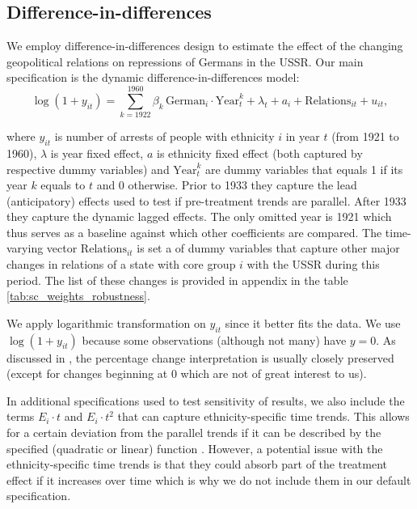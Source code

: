 \subsection{Difference-in-differences} \label{subsec:methodology_did}
We employ difference-in-differences design to estimate the effect of the changing geopolitical relations on repressions of Germans in the USSR. 
Our main specification is the dynamic difference-in-differences model:
\begin{equation}
 \log\left(1 + y_{it}\right) = \sum_{k= 1922}^{1960} \beta_k \, \text{German}_{i} \cdot \text{Year}_{t}^k +  \lambda_t + a_i +  \text{Relations}_{it}   + u_{it},
 \label{eq:dynamic_did}
\end{equation}

where $y_{it}$ is number of arrests of people with ethnicity $i$ in year $t$ (from 1921 to 1960), $\lambda$ is year fixed effect, $a$ is ethnicity fixed effect (both captured by respective dummy variables) and  $\text{Year}_{t}^k$ are dummy variables that equals 1 if its year $k$ equals to $t$ and 0 otherwise.
Prior to  1933 they capture the lead (anticipatory) effects  used to test if pre-treatment trends are parallel. After 1933 they capture the dynamic lagged effects. The only omitted year is 1921 which thus serves as a baseline against which other coefficients are compared. 
The time-varying vector $\text{Relations}_{it}$ is set a of dummy variables that capture other major changes in relations of a state with core group $i$ with the USSR during this period. The list of these changes is provided in appendix in the table \ref{tab:sc_weights_robustness}.

 We apply logarithmic transformation on $y_{it}$ since it better fits the data.  We use $\log\left(1 + y_{it}\right)$ because some observations (although not many) have $y = 0$. As discussed in \citet[p. 193]{wooldridge_introductory_2015},  the percentage change interpretation is usually  closely preserved (except for changes beginning at 0 which are not of great interest to us).   

In additional specifications used to test sensitivity of results, we also include  the terms $ E_i \cdot t$ and $ E_i \cdot t^2$  that can capture  ethnicity-specific time trends. 
This allows for a certain  deviation from the parallel trends if it can be described by the specified (quadratic or linear) function \citep[chapter 5]{angrist_mostly_2009}. 
However, a potential issue with the ethnicity-specific time trends is that they could absorb part of the treatment effect if it increases over time \citep{meer_effects_2016} which is why we do not include them in our default specification. 

